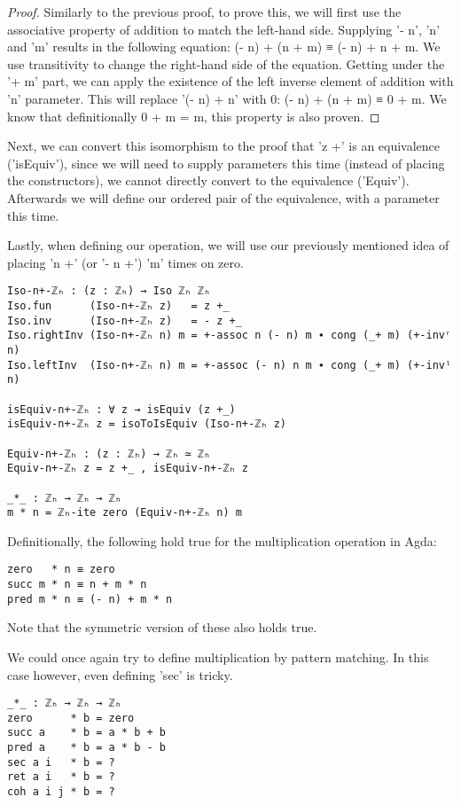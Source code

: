 \begin{proof}
  Similarly to the previous proof, to prove this, we will first use the associative property of addition to match the left-hand side. Supplying '- n', 'n' and 'm' results in the following equation: (- n) + (n + m) ≡ (- n) + n + m. We use transitivity to change the right-hand side of the equation. Getting under the '+ m' part, we can apply the existence of the left inverse element of addition with 'n' parameter. This will replace '(- n) + n' with 0: (- n) + (n + m) ≡ 0 + m. We know that definitionally 0 + m = m, this property is also proven.
\end{proof}

Next, we can convert this isomorphism to the proof that 'z +' is an equivalence ('isEquiv'), since we will need to supply parameters this time (instead of placing the constructors), we cannot directly convert to the equivalence ('Equiv'). Afterwards we will define our ordered pair of the equivalence, with a parameter this time.

Lastly, when defining our operation, we will use our previously mentioned idea of placing 'n +' (or '- n +') 'm' times on zero.

\begin{verbatim}
Iso-n+-ℤₕ : (z : ℤₕ) → Iso ℤₕ ℤₕ
Iso.fun      (Iso-n+-ℤₕ z)   = z +_
Iso.inv      (Iso-n+-ℤₕ z)   = - z +_
Iso.rightInv (Iso-n+-ℤₕ n) m = +-assoc n (- n) m ∙ cong (_+ m) (+-invʳ n)
Iso.leftInv  (Iso-n+-ℤₕ n) m = +-assoc (- n) n m ∙ cong (_+ m) (+-invˡ n)

isEquiv-n+-ℤₕ : ∀ z → isEquiv (z +_)
isEquiv-n+-ℤₕ z = isoToIsEquiv (Iso-n+-ℤₕ z)

Equiv-n+-ℤₕ : (z : ℤₕ) → ℤₕ ≃ ℤₕ
Equiv-n+-ℤₕ z = z +_ , isEquiv-n+-ℤₕ z

_*_ : ℤₕ → ℤₕ → ℤₕ
m * n = ℤₕ-ite zero (Equiv-n+-ℤₕ n) m
\end{verbatim}

Definitionally, the following hold true for the multiplication operation in Agda:
\begin{verbatim}
zero   * n ≡ zero
succ m * n ≡ n + m * n
pred m * n ≡ (- n) + m * n
\end{verbatim}
Note that the symmetric version of these also holds true.

We could once again try to define multiplication by pattern matching. In this case however, even defining 'sec' is tricky.
\begin{verbatim}
_*_ : ℤₕ → ℤₕ → ℤₕ
zero      * b = zero
succ a    * b = a * b + b
pred a    * b = a * b - b
sec a i   * b = ?
ret a i   * b = ?
coh a i j * b = ?
\end{verbatim}

